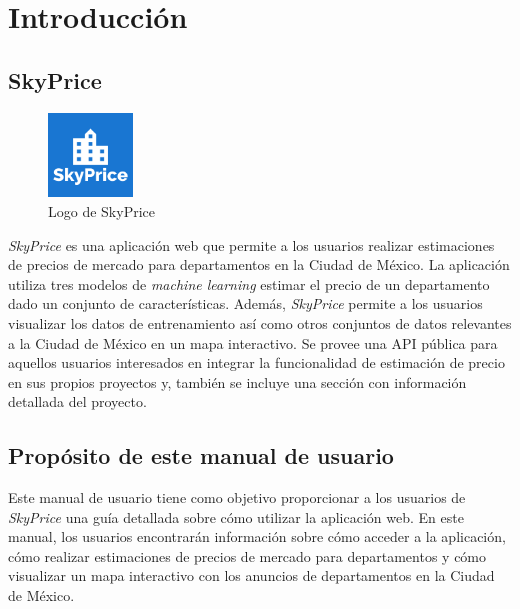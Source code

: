 
\chapter{\textcolor{azulescom}{Introducción}}


\section{SkyPrice}

\begin{figure}[H]
  \centering
  \includegraphics[width=0.2\textwidth]{imagenes/01-introduccion/skyprice-logo.png}
  \caption{Logo de SkyPrice}
  \label{fig:skyprice-logo}
\end{figure}

\textit{SkyPrice} es una aplicación web que permite a los usuarios realizar estimaciones
de precios de mercado para departamentos en la Ciudad de México. La aplicación
utiliza tres modelos de \textit{machine learning} estimar el precio de un departamento
dado un conjunto de características. Además, \textit{SkyPrice} permite a los
usuarios visualizar los datos de entrenamiento así como otros conjuntos de datos
relevantes a la Ciudad de México en un mapa interactivo. Se provee una API pública
para aquellos usuarios interesados en integrar la funcionalidad de estimación de precio
en sus propios proyectos y, también se incluye
una sección con información detallada del proyecto.

\section{Propósito de este manual de usuario}

Este manual de usuario tiene como objetivo proporcionar a los usuarios de \textit{SkyPrice}
una guía detallada sobre cómo utilizar la aplicación web. En este manual, los usuarios
encontrarán información sobre cómo acceder a la aplicación, cómo realizar estimaciones
de precios de mercado para departamentos y cómo visualizar un mapa interactivo con los
anuncios de departamentos en la Ciudad de México.

